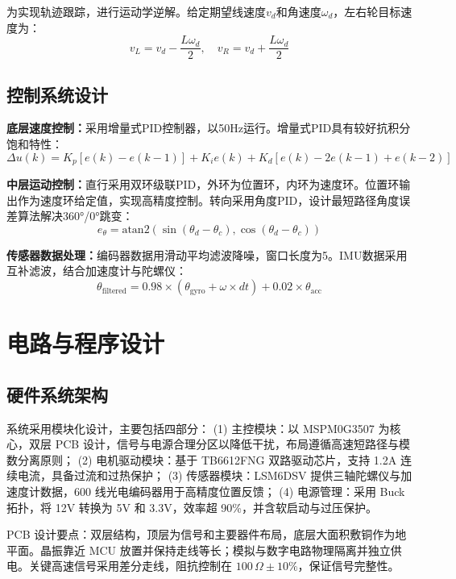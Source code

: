 \documentclass[UTF8]{ctexart}
\begin{document}
{为实现轨迹跟踪，进行运动学逆解。给定期望线速度$v_d$和角速度$\omega_d$，左右轮目标速度为：
\begin{equation}
v_L = v_d - \frac{L \omega_d}{2}, \quad v_R = v_d + \frac{L \omega_d}{2}
\end{equation}

\subsection{控制系统设计}
\textbf{底层速度控制：}采用增量式PID控制器，以50Hz运行。增量式PID具有较好抗积分饱和特性：
\begin{equation}
\Delta u(k) = K_p[e(k) - e(k-1)] + K_i e(k) + K_d[e(k) - 2e(k-1) + e(k-2)]
\end{equation}

\textbf{中层运动控制：}直行采用双环级联PID，外环为位置环，内环为速度环。位置环输出作为速度环给定值，实现高精度控制。转向采用角度PID，设计最短路径角度误差算法解决360°/0°跳变：
\begin{equation}
e_{\theta} = \text{atan2}(\sin(\theta_d - \theta_c), \cos(\theta_d - \theta_c))
\end{equation}

\textbf{传感器数据处理：}编码器数据用滑动平均滤波降噪，窗口长度为5。IMU数据采用互补滤波，结合加速度计与陀螺仪：
\begin{equation}
\theta_{\mathrm{filtered}} = 0.98 \times (\theta_{\mathrm{gyro}} + \omega \times dt) + 0.02 \times \theta_{\mathrm{acc}}
\end{equation}

\clearpage

		\section{电路与程序设计}
\subsection{硬件系统架构}

系统采用模块化设计，主要包括四部分：  
(1) 主控模块：以 MSPM0G3507 为核心，双层 PCB 设计，信号与电源合理分区以降低干扰，布局遵循高速短路径与模数分离原则；  
(2) 电机驱动模块：基于 TB6612FNG 双路驱动芯片，支持 1.2A 连续电流，具备过流和过热保护；  
(3) 传感器模块：LSM6DSV 提供三轴陀螺仪与加速度计数据，600 线光电编码器用于高精度位置反馈；  
(4) 电源管理：采用 Buck 拓扑，将 12V 转换为 5V 和 3.3V，效率超 90\%，并含软启动与过压保护。

PCB 设计要点：双层结构，顶层为信号和主要器件布局，底层大面积敷铜作为地平面。晶振靠近 MCU 放置并保持走线等长；模拟与数字电路物理隔离并独立供电。关键高速信号采用差分走线，阻抗控制在 $100\,\Omega \pm 10\%$，保证信号完整性。

}
\end{document}
